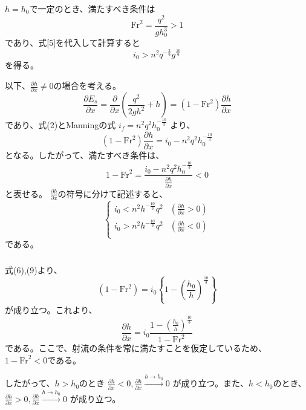 \documentclass[a4paper]{jsarticle}
\begin{document}
\subsubsection{}
$h = h_0$で一定のとき、満たすべき条件は
\begin{equation}
  \mathrm{Fr}^2 = \frac{q^2}{g h_0^3} > 1
\end{equation}
であり、式[5]を代入して計算すると
\begin{equation}
  i_0 > n^2 q^{-\frac{2}{9}} g^{\frac{10}{9}}
\end{equation}
を得る。\par
以下、$\frac{\partial h}{\partial x} \neq 0$の場合を考える。
\begin{equation}
  \frac{\partial E_s}{\partial x}
  = \frac{\partial}{\partial x}
  \left(\frac{q^2}{2 g h^2} + h\right)
  = (1 - \mathrm{Fr}^2) \frac{\partial h}{\partial x}
\end{equation}
であり、式(2)とManningの式
$i_f = n^2 q^2 h_0^{-\frac{10}{3}}$
より、
\begin{equation}
  (1 - \mathrm{Fr}^2) \frac{\partial h}{\partial x}
  = i_0 - n^2 q^2 h_0^{-\frac{10}{3}}
\end{equation}
となる。したがって、満たすべき条件は、
\begin{equation}
  1 - \mathrm{Fr}^2 =
  \frac{i_0 - n^2 q^2 h_0^{-\frac{10}{3}}}{\frac{\partial h}{\partial x}} < 0
\end{equation}
と表せる。
$\frac{\partial h}{\partial x}$の符号に分けて記述すると、
\begin{equation}
  \begin{cases}
    i_0 < n^2 h^{-\frac{10}{3}} q^2
    & \left(\frac{\partial h}{\partial x} > 0\right) \\
    i_0 > n^2 h^{-\frac{10}{3}} q^2
    & \left(\frac{\partial h}{\partial x} < 0\right) \\
  \end{cases}
\end{equation}
である。

\subsubsection{}
式(6),(9)より、
\begin{equation}
  (1 - \mathrm{Fr}^2) 
  = i_0 \left\{1 - \left(\frac{h_0}{h}\right)^{\frac{10}{3}}\right\}
\end{equation}
が成り立つ。これより、
\begin{equation}
  \frac{\partial h}{\partial x}
  = i_0 \frac{1 - \left(\frac{h_0}{h}\right)^{\frac{10}{3}}}{1 - \mathrm{Fr}^2}
\end{equation}
である。ここで、射流の条件を常に満たすことを仮定しているため、
$1 - \mathrm{Fr}^2 < 0$である。\par
したがって、$h > h_0$のとき
$\frac{\partial h}{\partial x} < 0, \frac{\partial h}{\partial x} \xrightarrow{h \to h_0} 0$
が成り立つ。また、$h < h_0$のとき、
$\frac{\partial h}{\partial x} > 0, \frac{\partial h}{\partial x} \xrightarrow{h \to h_0} 0$
が成り立つ。
\end{document}
